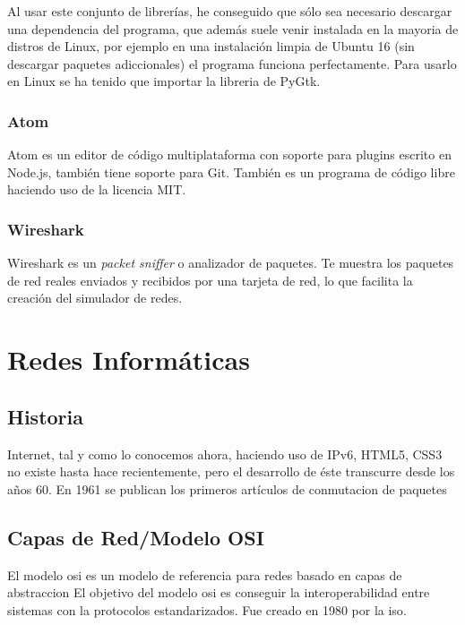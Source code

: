 \documentclass[a4paper, 11pt, twoside]{report} %
\begin{document}
Al usar este conjunto de librerías, he conseguido que sólo sea necesario descargar una dependencia del programa, que además suele venir instalada en la mayoria de distros de Linux, por ejemplo en una instalación limpia de Ubuntu 16 (sin descargar paquetes adiccionales) el programa funciona perfectamente. Para usarlo en Linux se ha tenido que importar la libreria de PyGtk.
\subsection{Atom}
Atom es un editor de código multiplataforma con soporte para plugins escrito en Node.js, también tiene soporte para Git. También es un programa de código libre haciendo uso de la licencia MIT.

\subsection{Wireshark}
Wireshark es un \textit{packet sniffer} o analizador de paquetes. Te muestra los paquetes de red reales enviados y recibidos por una tarjeta de red, lo que facilita la creación del simulador de redes.

\chapter{Redes Informáticas}

\section*{Historia}
Internet, tal y como lo conocemos ahora, haciendo uso de IPv6, HTML5, CSS3 no existe hasta hace recientemente, pero el desarrollo de éste transcurre desde los años 60. En 1961 se publican los primeros artículos de \gls{conmutacion de paquetes}

\section{Capas de Red/Modelo OSI}
El modelo \acrshort{osi} es un modelo de referencia para redes basado en \gls{capas de abstraccion}
El objetivo del modelo \acrshort{osi} es conseguir la interoperabilidad entre sistemas con la protocolos estandarizados. Fue creado en 1980 por la \gls{iso}.

\end{document}
